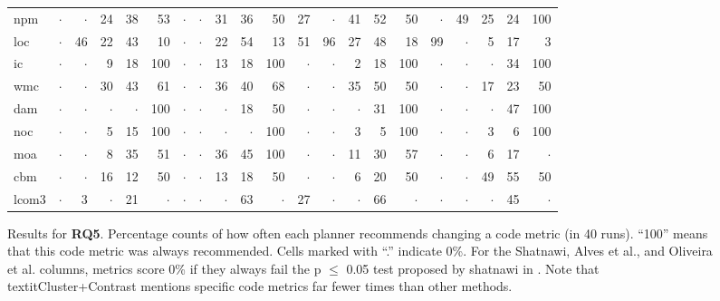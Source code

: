 \begin{figure*}[ht!]
\begin{minipage}{\linewidth}
{\begin{tabular}{l@{~}|r@{~}r|@{~}r@{~}r@{~}r|r@{~}r|r@{~}r@{~}r|r@{~}r|r@{~}r@{~}r|r@{~}r|r@{~}r@{~}r}
    npm   & $\cdot$     & $\cdot$     & 24    & 38    & 53    & $\cdot$     & $\cdot$     & 31    & 36    & 50    & 27    & $\cdot$     & 41    & 52    & 50    & $\cdot$     & 49    & 25    & 24    & 100 \bigstrut\\
    loc   & $\cdot$     & 46    & 22    & 43    & 10    & $\cdot$     & $\cdot$     & 22    & 54    & 13    & 51    & 96    & 27    & 48    & 18    & 99    & $\cdot$     & 5     & 17    & 3 \bigstrut\\
    ic    & $\cdot$     & $\cdot$     & 9     & 18    & 100   & $\cdot$     & $\cdot$     & 13    & 18    & 100   & $\cdot$     & $\cdot$     & 2     & 18    & 100   & $\cdot$     & $\cdot$     & $\cdot$     & 34    & 100 \bigstrut\\
    wmc   & $\cdot$     & $\cdot$     & 30    & 43    & 61    & $\cdot$     & $\cdot$     & 36    & 40    & 68    & $\cdot$     & $\cdot$     & 35    & 50    & 50    & $\cdot$     & $\cdot$     & 17    & 23    & 50 \bigstrut\\
    dam   & $\cdot$     & $\cdot$     & $\cdot$     & $\cdot$     & 100   & $\cdot$     & $\cdot$     & $\cdot$     & 18    & 50    & $\cdot$     & $\cdot$     & $\cdot$     & 31    & 100   & $\cdot$     & $\cdot$     & $\cdot$     & 47    & 100 \bigstrut\\
    noc   & $\cdot$     & $\cdot$     & 5     & 15    & 100   & $\cdot$     & $\cdot$     & $\cdot$     & $\cdot$     & 100   & $\cdot$     & $\cdot$     & 3     & 5     & 100   & $\cdot$     & $\cdot$     & 3     & 6     & 100 \bigstrut\\
    moa   & $\cdot$     & $\cdot$     & 8     & 35    & 51    & $\cdot$     & $\cdot$     & 36    & 45    & 100   & $\cdot$     & $\cdot$     & 11    & 30    & 57    & $\cdot$     & $\cdot$     & 6     & 17    & $\cdot$ \bigstrut\\
    cbm   & $\cdot$     & $\cdot$     & 16    & 12    & 50    & $\cdot$     & $\cdot$     & 13    & 18    & 50    & $\cdot$     & $\cdot$     & 6     & 20    & 50    & $\cdot$     & $\cdot$     & 49    & 55    & 50 \bigstrut\\
    lcom3 & $\cdot$     & 3     & $\cdot$     & 21    & $\cdot$     & $\cdot$     & $\cdot$     & $\cdot$     & 63    & $\cdot$     & 27    & $\cdot$     & $\cdot$     & 66    & $\cdot$     & $\cdot$     & $\cdot$     & $\cdot$     & 45    & $\cdot$ \bigstrut\\
    \hline
    \end{tabular}}%
\end{minipage}
\caption{Results for {\bf RQ5}.
Percentage counts of  how often each planner recommends changing a code metric
(in 40 runs). ``100'' means that this code metric
was always recommended. Cells marked with ``.'' indicate  0\%. For the Shatnawi, Alves et al., and Oliveira et al.
columns,  metrics score 0\% if they always fail the p $\le$ 0.05 test proposed by shatnawi in . Note
that textit{Cluster+Contrast} mentions specific code metrics
far fewer times than other methods.}
  \label{fig:rq2_1}%
\end{figure*}%

